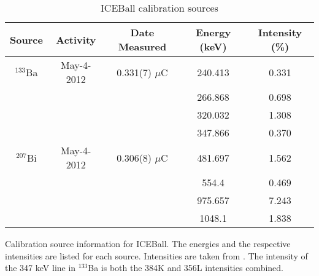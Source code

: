 \begin{table}[]
    \centering
    \caption{ICEBall calibration sources}
    \begin{tabular}{c|c|c|c|c} \toprule
         Source & Activity & Date Measured & Energy (keV) & Intensity (\%)\\
          \hline 
         $^{133}$Ba & May-4-2012 & 0.331(7) $\mu$C & 240.413 & 0.331 \\
         & & & 266.868 & 0.698 \\
         & & & 320.032 & 1.308 \\
         & & & 347.866 & 0.370 \\
         \hline
         $^{207}$Bi & May-4-2012 & 0.306(8) $\mu$C & 481.697 & 1.562 \\ 
         & & & 554.4 & 0.469 \\
         & & & 975.657 & 7.243 \\
         & & & 1048.1 & 1.838 \\\bottomrule
    \end{tabular}
    \footnotesize
    \item Calibration source information for ICEBall. The energies and the respective intensities are listed for each source. Intensities are taken from \cite{trzaska90:_calibration}. The intensity of the 347 keV line in $^{133}$Ba is both the 384K and 356L intensities combined.
    \label{tab:ICE_Cal_Source}
\end{table}